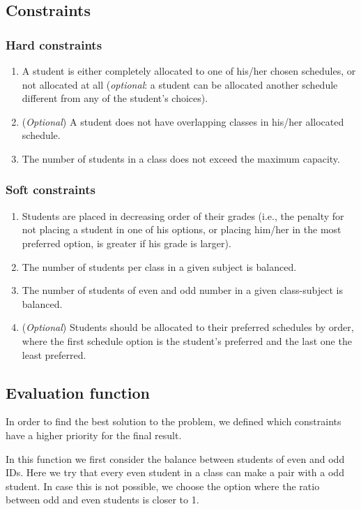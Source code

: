 \documentclass[runningheads]{llncs}
\begin{document}
\subsection{Constraints}

\subsubsection{Hard constraints}
\begin{enumerate}
    \item A student is either completely allocated to one of his/her chosen schedules, or not allocated at all (\textit{optional}: a student can be allocated another schedule different from any of the student's choices).
    \item (\textit{Optional}) A student does not have overlapping classes in his/her allocated schedule.
    \item The number of students in a class does not exceed the maximum capacity.
\end{enumerate}

\subsubsection{Soft constraints}
\begin{enumerate}
    \item Students are placed in decreasing order of their grades (i.e., the penalty for not placing a student in one of his options, or placing him/her in the most preferred option, is greater if his grade is larger).
    \item The number of students per class in a given subject is balanced.
    \item The number of students of even and odd number in a given class-subject is balanced.
    \item (\textit{Optional}) Students should be allocated to their preferred schedules by order, where the first schedule option is the student's preferred and the last one the least preferred.
\end{enumerate}

\subsection{Evaluation function}

In order to find the best solution to the problem, we defined which constraints have a higher priority for the final result.

In this function we first consider the balance between students of even and odd IDs. Here we try that every even student in a class can make a pair with a odd student.
In case this is not possible, we choose the option where the ratio between odd and even students is closer to 1. 
\end{document}
